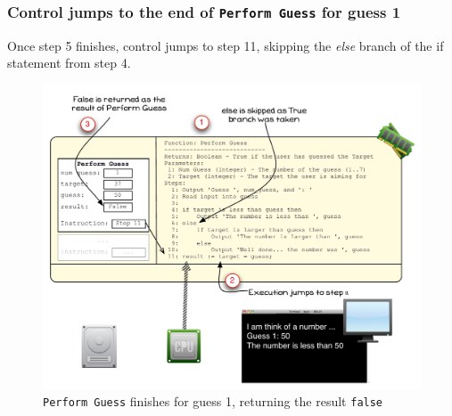 
\clearpage

\subsubsection{Control jumps to the end of \texttt{Perform Guess} for guess 1} %
\label{ssub:control_jumps_to_step_11_for_guess_1}

Once step 5 finishes, control jumps to step 11, skipping the \emph{else} branch of the if statement from step 4.

\begin{figure}[htbp]
   \centering
   \includegraphics[width=\textwidth]{./topics/control-flow/images/PerformGuess4} 
   \caption{\texttt{Perform Guess} finishes for guess 1, returning the result \texttt{false}}
   \label{fig:perform-guess-4}
\end{figure}

